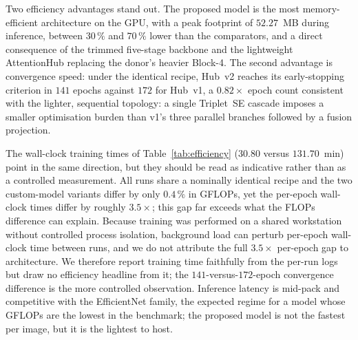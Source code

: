 Two efficiency advantages stand out. The proposed model is the most
memory-efficient architecture on the GPU, with a peak footprint of
$52.27$~MB during inference, between $30\,\%$ and $70\,\%$ lower than the
comparators, and a direct consequence of the trimmed five-stage backbone and
the lightweight AttentionHub replacing the donor's heavier Block-4. The second
advantage is convergence speed: under the identical recipe, Hub~v2 reaches its
early-stopping criterion in $141$ epochs against $172$ for Hub~v1, a $0.82\times$
epoch count consistent with the lighter, sequential topology: a single
Triplet~\arrowto{}SE cascade imposes a smaller optimisation burden than v1's
three parallel branches followed by a fusion projection.

The wall-clock training times of Table~\ref{tab:efficiency} ($30.80$ versus
$131.70$~min) point in the same direction, but they should be read as
indicative rather than as a controlled measurement. All runs share a nominally
identical recipe and the two custom-model variants differ by only $0.4\,\%$ in
GFLOPs, yet the per-epoch wall-clock times differ by roughly $3.5\times$; this
gap far exceeds what the FLOPs difference can explain. Because training was
performed on a shared workstation without controlled process isolation,
background load can perturb per-epoch wall-clock time between runs, and we do
not attribute the full $3.5\times$ per-epoch gap to architecture. We therefore
report training time faithfully from the per-run logs but draw no efficiency
headline from it; the $141$-versus-$172$-epoch convergence difference is the
more controlled observation. Inference latency is mid-pack and competitive with
the EfficientNet family, the expected regime for a model whose GFLOPs are the
lowest in the benchmark; the proposed model is not the fastest per image, but it
is the lightest to host.
